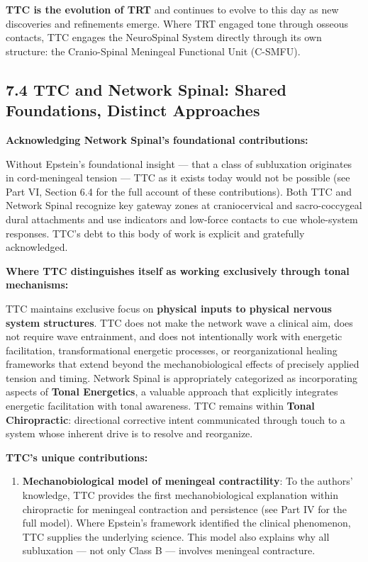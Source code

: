\documentclass[11pt,letterpaper]{article}
\begin{document}
\textbf{TTC is the evolution of TRT} and continues to evolve to this day as new discoveries and refinements emerge. Where TRT engaged tone through osseous contacts, TTC engages the NeuroSpinal System directly through its own structure: the Cranio-Spinal Meningeal Functional Unit (C-SMFU).


\subsection{7.4 TTC and Network Spinal: Shared Foundations, Distinct Approaches}

\textbf{Acknowledging Network Spinal's foundational contributions:}

Without Epstein's foundational insight — that a class of subluxation originates in cord-meningeal tension — TTC as it exists today would not be possible (see Part VI, Section 6.4 for the full account of these contributions). Both TTC and Network Spinal recognize key gateway zones at craniocervical and sacro-coccygeal dural attachments and use indicators and low-force contacts to cue whole-system responses. TTC's debt to this body of work is explicit and gratefully acknowledged.


\textbf{Where TTC distinguishes itself as working exclusively through tonal mechanisms:}

TTC maintains exclusive focus on \textbf{physical inputs to physical nervous system structures}. TTC does not make the network wave a clinical aim, does not require wave entrainment, and does not intentionally work with energetic facilitation, transformational energetic processes, or reorganizational healing frameworks that extend beyond the mechanobiological effects of precisely applied tension and timing. Network Spinal is appropriately categorized as incorporating aspects of \textbf{Tonal Energetics}, a valuable approach that explicitly integrates energetic facilitation with tonal awareness. TTC remains within \textbf{Tonal Chiropractic}: directional corrective intent communicated through touch to a system whose inherent drive is to resolve and reorganize.


\textbf{TTC's unique contributions:}


\begin{enumerate}
\item \textbf{Mechanobiological model of meningeal contractility}: To the authors' knowledge, TTC provides the first mechanobiological explanation within chiropractic for meningeal contraction and persistence (see Part IV for the full model). Where Epstein's framework identified the clinical phenomenon, TTC supplies the underlying science. This model also explains why all subluxation — not only Class B — involves meningeal contracture.
\end{enumerate}
\end{document}
